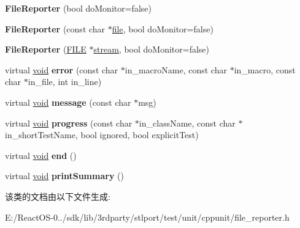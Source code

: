\begin{DoxyCompactItemize}
\item 
\mbox{\label{class_file_reporter_ac86c429ed1a99ceffcc4ab68c662e000}} 
{\bfseries File\+Reporter} (bool do\+Monitor=false)
\item 
\mbox{\label{class_file_reporter_a4de221c9cf38563e70c859d8e6cfdccb}} 
{\bfseries File\+Reporter} (const char $\ast$\hyperlink{structfile}{file}, bool do\+Monitor=false)
\item 
\mbox{\label{class_file_reporter_a09427c7d5e20e6b69c4649d7952a89ae}} 
{\bfseries File\+Reporter} (\hyperlink{struct__iobuf}{F\+I\+LE} $\ast$\hyperlink{structstream}{stream}, bool do\+Monitor=false)
\item 
\mbox{\label{class_file_reporter_a2f6870f4f56ac69a1947fa6e25652e9b}} 
virtual \hyperlink{interfacevoid}{void} {\bfseries error} (const char $\ast$in\+\_\+macro\+Name, const char $\ast$in\+\_\+macro, const char $\ast$in\+\_\+file, int in\+\_\+line)
\item 
\mbox{\label{class_file_reporter_a07475cf340df4e8cca2a886ba88ad02c}} 
virtual \hyperlink{interfacevoid}{void} {\bfseries message} (const char $\ast$msg)
\item 
\mbox{\label{class_file_reporter_a8dba1b063a56acddbdb262247b233680}} 
virtual \hyperlink{interfacevoid}{void} {\bfseries progress} (const char $\ast$in\+\_\+class\+Name, const char $\ast$in\+\_\+short\+Test\+Name, bool ignored, bool explicit\+Test)
\item 
\mbox{\label{class_file_reporter_a6a572cf01117b95f239aa73db3330286}} 
virtual \hyperlink{interfacevoid}{void} {\bfseries end} ()
\item 
\mbox{\label{class_file_reporter_a87dc7d8a19e8003969386216fbc4de17}} 
virtual \hyperlink{interfacevoid}{void} {\bfseries print\+Summary} ()
\end{DoxyCompactItemize}


该类的文档由以下文件生成\+:\begin{DoxyCompactItemize}
\item 
E\+:/\+React\+O\+S-\/0../sdk/lib/3rdparty/stlport/test/unit/cppunit/file\+\_\+reporter.\+h\end{DoxyCompactItemize}
